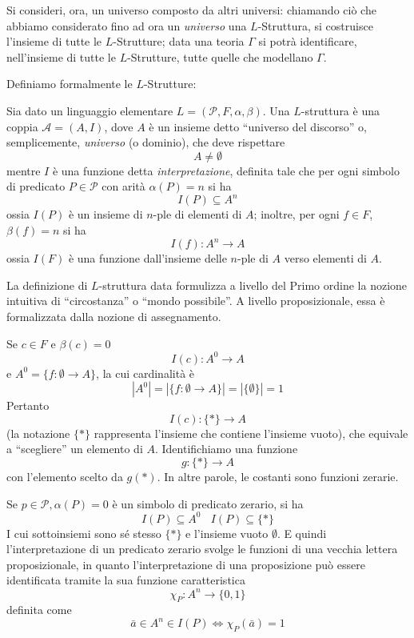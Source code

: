 Si consideri, ora,  un universo composto da altri universi: chiamando 
ciò che abbiamo considerato fino ad ora 
un \textit{universo} una $L$-Struttura, si costruisce l'insieme 
di tutte le $L$-Strutture; data una teoria $\Gamma$ si potrà identificare, 
nell'insieme di tutte le $L$-Strutture, tutte quelle che modellano $\Gamma$. 

Definiamo formalmente le $L$-Strutture:
\begin{defi}[$L$-Struttura]
        Sia dato un linguaggio elementare $L  = (\mathcal{P}, F, \alpha, \beta)$. 
        Una $L$-struttura è una coppia $\mathcal{A} = (A, I)$, dove 
        $A$ è un insieme detto ``universo del discorso'' o, semplicemente, 
        \textit{universo} (o dominio), che deve rispettare 
        $$
        A \neq \emptyset
        $$
        mentre $I$ è una funzione detta \textit{interpretazione}, definita 
        tale che per ogni simbolo di 
        predicato $P \in \mathcal{P}$ con arità $\alpha(P) = n$ si ha 
        $$
        I(P) \subseteq A^{n} 
        $$
        ossia $I(P)$ è un insieme di $n$-ple di elementi di $A$; inoltre, 
        per ogni $f \in F$, $\beta(f) = n$ si ha 
        $$
        I(f) : A^{n} \rightarrow A
        $$
        ossia $I(F)$ è una funzione dall'insieme delle $n$-ple di $A$ verso elementi 
        di $A$.
\end{defi}

La definizione di $L$-struttura data formulizza a livello del Primo ordine la 
nozione intuitiva di ``circostanza'' o ``mondo possibile''. A livello proposizionale, 
essa è formalizzata dalla nozione di assegnamento. 


\begin{oss}[Costanti]
        Se $c \in F$ e $\beta(c) = 0$ 
        $$
        I(c) : A^{0} \rightarrow A
        $$
        e $A^{0} = \{f: \emptyset  \rightarrow A\}$, la cui cardinalità è  
        $$ 
        |A^0| = |\{f:\emptyset\rightarrow A\}| = |\{\emptyset\}| = 1
        $$
        Pertanto 
        $$
        I(c): \{*\} \rightarrow A
        $$ 
(la notazione $\{*\}$
        rappresenta 
        l'insieme che contiene l'insieme vuoto), che equivale a 
        ``scegliere'' un elemento di $A$.
        Identifichiamo una funzione 
        $$
        g : \{*\} \rightarrow A 
        $$
        con l'elemento scelto da $g(*)$. In altre parole, le costanti sono funzioni
        zerarie.
\end{oss}

\begin{oss}
        Se $p \in \mathcal{P}, \alpha(P) = 0$ è un simbolo di 
        predicato zerario, si ha 
        $$
        I(P) \subseteq A^0 ~~~~ I(P) \subseteq \{*\}
        $$
        I cui sottoinsiemi sono sé stesso $\{*\}$ e l'insieme vuoto $\emptyset$. 
        E quindi l'interpretazione di un predicato zerario svolge le funzioni 
        di una vecchia lettera proposizionale, in quanto l'interpretazione 
        di una proposizione può essere identificata tramite la sua funzione 
        caratteristica 
        $$
        \chi_P: A^n \rightarrow \{0,1\}
        $$
        definita come 
        $$
        \bar{a} \in A^n \in I(P) \iff \chi_P(\bar{a}) = 1
        $$
\end{oss}

